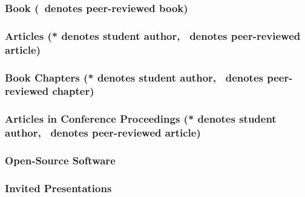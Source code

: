 \documentclass[10pt]{article}
\begin{document}
	\subsubsection[Book]{Book (\textdagger\ denotes peer-reviewed book)}
        \begin{refsection}
            \nocite{*}
            \printbibliography[heading=none, type=book, keyword=tenuretrack]
        \end{refsection}
	\subsubsection[Articles]{Articles (* denotes student author, \textdagger\ denotes peer-reviewed article)}
    \begin{refsection}
        \nocite{*}
        \printbibliography[heading=none, type=article, keyword=tenuretrack]
    \end{refsection}

	\subsubsection[Book Chapters]{Book Chapters (* denotes student author, \textdagger\ denotes peer-reviewed chapter)}
    \begin{refsection}
        \nocite{*}
        \printbibliography[heading=none, type=incollection, keyword=tenuretrack]
    \end{refsection}
	\subsubsection[Articles in Conference Proceedings]{Articles in Conference Proceedings (* denotes student author, \textdagger\ denotes peer-reviewed article)}
    \begin{refsection}
        \nocite{*}
        \printbibliography[heading=none, type=inproceedings, keyword=tenuretrack]
    \end{refsection}
  \subsubsection{Open-Source Software}
  		
  \subsubsection{Invited Presentations}
    \begin{enumerate}
    	
    \end{enumerate}
\end{document}
